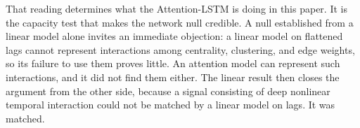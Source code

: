 \documentclass[pdflatex,sn-mathphys-num]{sn-jnl}%
\theoremstyle{thmstyleone}%
\theoremstyle{thmstyletwo}%
\theoremstyle{thmstylethree}%
\begin{document}
That reading determines what the Attention-LSTM is doing in this paper. It is the capacity test that makes the network null credible. A null established from a linear model alone invites an immediate objection: a linear model on flattened lags cannot represent interactions among centrality, clustering, and edge weights, so its failure to use them proves little. An attention model can represent such interactions, and it did not find them either. The linear result then closes the argument from the other side, because a signal consisting of deep nonlinear temporal interaction could not be matched by a linear model on lags. It was matched.




\end{document}
